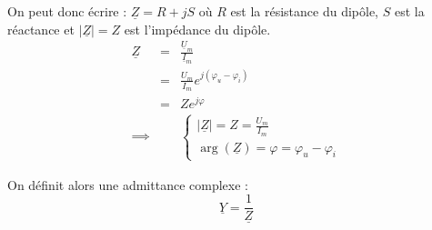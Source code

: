 \begin{corollary}
    On peut donc écrire  : \(\underline{Z} = R + jS\) où \(R\) est la résistance du dipôle, \(S\) est la réactance et \(\lvert \underline{Z} \rvert = Z  \) est l'impédance du dipôle.
    \begin{eqnarray*}
        \underline{Z} &=& \frac{\underline{U}_{m}}{\underline{I}_{m}} \\
        &=& \frac{U_{m}}{I_{m}} e^{ j (\varphi_{u} - \varphi_{i}) } \\
        &=& Z e^{ j \varphi } \\
        \implies && \begin{cases}
            \lvert \underline{Z} \rvert = Z  = \frac{U_{m}}{I_{m}} \\
            \arg (\underline{Z}) = \varphi = \varphi_{u} - \varphi_{i}
        \end{cases}
    \end{eqnarray*}
\end{corollary}

\begin{definition}[admittance]
    On définit alors une admittance complexe : 
    \[
        \underline{Y} = \frac{1}{\underline{Z}}
    \]
\end{definition}


